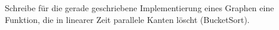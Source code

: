 \begin{aufg}
Schreibe für die gerade geschriebene Implementierung eines Graphen eine Funktion, die in linearer Zeit parallele Kanten löscht (BucketSort).
\end{aufg}